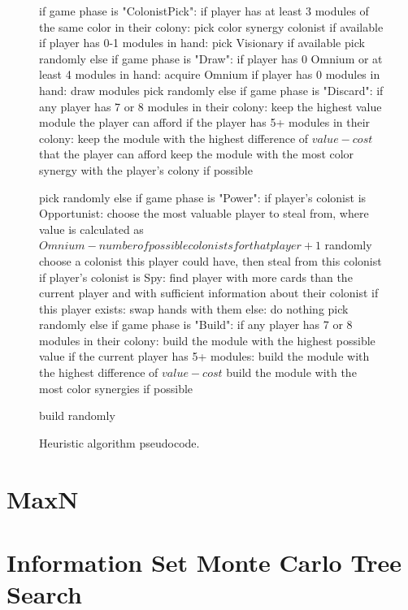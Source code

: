 \begin{figure}[h!]
\begin{code}[commandchars=\\\{\},codes={\catcode`\$=3\catcode`\^=7\catcode`\_=8}]
if game phase is "ColonistPick":
    if player has at least 3 modules of the same color in their colony:
        pick color synergy colonist if available
    if player has 0-1 modules in hand:
        pick Visionary if available
    pick randomly
else if game phase is "Draw":
    if player has 0 Omnium or at least 4 modules in hand:
        acquire Omnium
    if player has 0 modules in hand:
        draw modules
    pick randomly
else if game phase is "Discard":
    if any player has 7 or 8 modules in their colony:
        keep the highest value module the player can afford
    if the player has 5+ modules in their colony:
        keep the module with the highest difference of $value - cost$
        that the player can afford
    keep the module with the most color synergy with the player's
    colony if possible

    pick randomly
else if game phase is "Power":
    if player's colonist is Opportunist:
        choose the most valuable player to steal from,
        where value is calculated as
        $Omnium - number of possible colonists for that player + 1$
        randomly choose a colonist this player could have,
        then steal from this colonist
    if player's colonist is Spy:
        find player with more cards than the current player
        and with sufficient information about their colonist
        if this player exists:
            swap hands with them
        else:
            do nothing
    pick randomly
else if game phase is "Build":
    if any player has 7 or 8 modules in their colony:
        build the module with the highest possible value
    if the current player has 5+ modules:
        build the module with the highest difference of $value - cost$
    build the module with the most color synergies if possible

    build randomly
\end{code}
\caption{Heuristic algorithm pseudocode.}\label{algo:heur}
\end{figure}

\clearpage
\section{MaxN}
\label{sec:algomaxn}

\section{Information Set Monte Carlo Tree Search}
